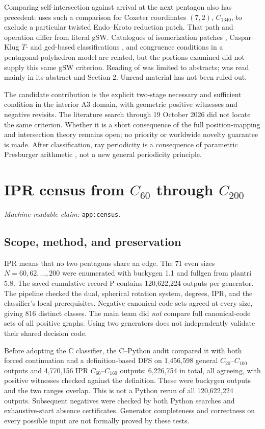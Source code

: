 \documentclass[11pt]{amsart}
\newcommand{\record}[1]{\nolinkurl{#1}}
\newcommand{\claimid}[1]{\par\nopagebreak\noindent\textit{Machine-readable claim:} \record{#1}.\par}
\begin{document}
Comparing self-intersection against arrival at the next pentagon also
has precedent: \cite[Section 6, Fig.~5]{Growing} uses such a comparison
for Coxeter coordinates $(7,2)$, $C_{1340}$, to exclude a particular
twisted Endo--Kroto reduction patch. That path and operation differ from
literal gSW. Catalogues of isomerization patches \cite{Patches},
Caspar--Klug $T$- and gcd-based classifications \cite{Capsids}, and
congruence conditions in a pentagonal-polyhedron model \cite{Pentagonal}
are related, but the portions examined did not supply this same gSW
criterion. Reading of \cite{Patches,Knots} was limited to abstracts;
\cite{Pentagonal} was read mainly in its abstract and Section 2.
Unread material has not been ruled out.

The candidate contribution is the explicit two-stage necessary and
sufficient condition in the interior A3 domain, with geometric positive
witnesses and negative revisits. The literature search through
19 October 2026 did not locate the same criterion. Whether it is a
short consequence of the full position-mapping and intersection theory
remains open; no priority or worldwide novelty guarantee is made.
After classification, ray periodicity is a consequence of parametric
Presburger arithmetic \cite[Theorem 1.15, Property 1]{BGW}, not a new
general periodicity principle.

\appendix
\section{IPR census from \texorpdfstring{$C_{60}$}{C60} through \texorpdfstring{$C_{200}$}{C200}}\label{app:census}
\claimid{app:census}
\subsection{Scope, method, and preservation}
IPR means that no two pentagons share an edge. The 71 even sizes
$N=60,62,\ldots,200$ were enumerated with buckygen 1.1 and fullgen
from plantri 5.8. The saved cumulative record P contains 120,622,224
outputs per generator. The pipeline checked the dual, spherical
rotation system, degrees, IPR, and the classifier's local prerequisites.
Negative canonical-code sets agreed at every size, giving 816 distinct
classes. The main team did \emph{not} compare full canonical-code sets
of all positive graphs. Using two generators does not independently
validate their shared decision code.

Before adopting the C classifier, the C--Python audit compared it with
both forced continuation and a definition-based DFS on 1,456,598
general $C_{20}$--$C_{100}$ outputs and 4,770,156 IPR
$C_{60}$--$C_{160}$ outputs: 6,226,754 in total, all agreeing, with
positive witnesses checked against the definition. These were buckygen
outputs and the two ranges overlap. This is not a Python rerun of all
120,622,224 outputs. Subsequent negatives were checked by both Python
searches and exhaustive-start absence certificates. Generator
completeness and correctness on every possible input are not formally
proved by these tests.
\end{document}
